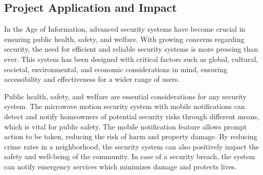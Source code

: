 \subsection{Project Application and Impact}\label{subsec:project-application-and-impact}

In the Age of Information, advanced security systems have become crucial in ensuring public
health, safety, and welfare. With growing concerns regarding security, the need for
efficient and reliable security systems is more pressing than ever. This system has been designed
with critical factors such as global, cultural, societal, environmental, and economic
considerations in mind, ensuring accessibility and effectiveness for a wider range of users.

Public health, safety, and welfare are essential considerations for any security system.
The microwave motion security system with mobile notifications can detect and notify homeowners 
of potential security risks through different means, which is vital for public safety. 
The mobile notification feature allows prompt action to be taken, reducing the risk of 
harm and property damage. By reducing crime rates in a neighborhood, the security system 
can also positively impact the safety and well-being of the community. In case of a 
security breach, the system can notify emergency services which minimizes damage and protects lives.